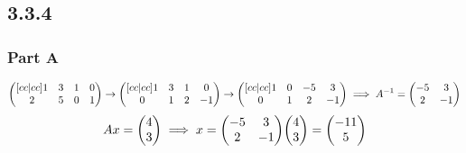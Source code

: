 \documentclass[12pt,titlepage]{extarticle}
\begin{document}
\subsection*{3.3.4}

\subsubsection*{Part A}
\begin{align*}
    \begin{pmatrix}[cc|cc]
        1 & 3 & 1 & 0 \\
        2 & 5 & 0 & 1
    \end{pmatrix} \rightarrow
    \begin{pmatrix}[cc|cc]
        1 & 3 & 1 & 0 \\
        0 & 1 & 2 & -1
    \end{pmatrix} \rightarrow
    \begin{pmatrix}[cc|cc]
        1 & 0 & -5 & 3 \\
        0 & 1 & 2 & -1
    \end{pmatrix} \implies A^{-1} = \mqty(-5 & 3 \\ 2 & -1)
\end{align*}
\[
    Ax = \mqty(4 \\ 3) \implies x = \mqty(-5 & 3 \\ 2 & -1) \mqty(4 \\ 3) = \mqty(-11 \\ 5)
\]
\end{document}
